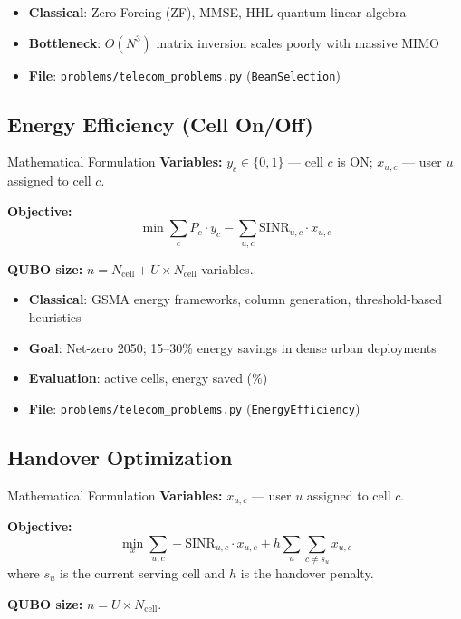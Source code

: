 \documentclass[11pt,a4paper]{article}
\begin{document}
\begin{itemize}
  \item \textbf{Classical}: Zero-Forcing (ZF), MMSE, HHL quantum linear algebra
  \item \textbf{Bottleneck}: $O(N^3)$ matrix inversion scales poorly with massive MIMO
  \item \textbf{File}: \texttt{problems/telecom\_problems.py} (\texttt{BeamSelection})
\end{itemize}

\subsection{Energy Efficiency (Cell On/Off)}

\begin{mathbox}{Mathematical Formulation}
\textbf{Variables:} $y_c \in \{0,1\}$ — cell $c$ is ON; $x_{u,c}$ — user $u$ assigned to cell $c$.

\textbf{Objective:}
$$\min \sum_c P_c \cdot y_c - \sum_{u,c} \text{SINR}_{u,c} \cdot x_{u,c}$$

\textbf{QUBO size:} $n = N_{\text{cell}} + U \times N_{\text{cell}}$ variables.
\end{mathbox}

\begin{itemize}
  \item \textbf{Classical}: GSMA energy frameworks, column generation, threshold-based heuristics
  \item \textbf{Goal}: Net-zero 2050; 15--30\% energy savings in dense urban deployments
  \item \textbf{Evaluation}: active cells, energy saved (\%)
  \item \textbf{File}: \texttt{problems/telecom\_problems.py} (\texttt{EnergyEfficiency})
\end{itemize}

\subsection{Handover Optimization}

\begin{mathbox}{Mathematical Formulation}
\textbf{Variables:} $x_{u,c}$ — user $u$ assigned to cell $c$.

\textbf{Objective:}
$$\min_{x} \sum_{u,c} -\text{SINR}_{u,c} \cdot x_{u,c} + h \sum_{u} \sum_{c \neq s_u} x_{u,c}$$
where $s_u$ is the current serving cell and $h$ is the handover penalty.

\textbf{QUBO size:} $n = U \times N_{\text{cell}}$.
\end{mathbox}
\end{document}

